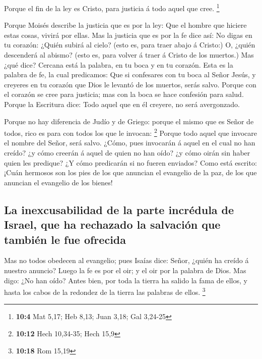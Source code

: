  Porque el fin de la ley es Cristo, para justicia á todo
aquel que cree. \footnote{\textbf{10:4} Mat 5,17; Heb 8,13; Juan 3,18;
  Gal 3,24-25}

 Porque Moisés describe la justicia que es por la ley: Que
el hombre que hiciere estas cosas, vivirá por ellas.  Mas la
justicia que es por la fe dice así: No digas en tu corazón: ¿Quién
subirá al cielo? (esto es, para traer abajo á Cristo:)  O,
¿quién descenderá al abismo? (esto es, para volver á traer á Cristo de
los muertos.)  Mas ¿qué dice? Cercana está la palabra, en tu
boca y en tu corazón. Esta es la palabra de fe, la cual predicamos:
 Que si confesares con tu boca al Señor Jesús, y creyeres en
tu corazón que Dios le levantó de los muertos, serás salvo.
 Porque con el corazón se cree para justicia; mas con la
boca se hace confesión para salud.  Porque la Escritura
dice: Todo aquel que en él creyere, no será avergonzado.

 Porque no hay diferencia de Judío y de Griego: porque el
mismo que es Señor de todos, rico es para con todos los que le invocan:
\footnote{\textbf{10:12} Hech 10,34-35; Hech 15,9}  Porque
todo aquel que invocare el nombre del Señor, será salvo. 
¿Cómo, pues invocarán á aquel en el cual no han creído? ¿y cómo creerán
á aquel de quien no han oído? ¿y cómo oirán sin haber quien les
predique?  ¿Y cómo predicarán si no fueren enviados? Como
está escrito: ¡Cuán hermosos son los pies de los que anuncian el
evangelio de la paz, de los que anuncian el evangelio de los bienes!

\hypertarget{la-inexcusabilidad-de-la-parte-incruxe9dula-de-israel-que-ha-rechazado-la-salvaciuxf3n-que-tambiuxe9n-le-fue-ofrecida}{%
\subsection{La inexcusabilidad de la parte incrédula de Israel, que ha
rechazado la salvación que también le fue
ofrecida}\label{la-inexcusabilidad-de-la-parte-incruxe9dula-de-israel-que-ha-rechazado-la-salvaciuxf3n-que-tambiuxe9n-le-fue-ofrecida}}

 Mas no todos obedecen al evangelio; pues Isaías dice:
Señor, ¿quién ha creído á nuestro anuncio?  Luego la fe es
por el oir; y el oir por la palabra de Dios.  Mas digo: ¿No
han oído? Antes bien, por toda la tierra ha salido la fama de ellos, y
hasta los cabos de la redondez de la tierra las palabras de ellos.
\footnote{\textbf{10:18} Rom 15,19}

